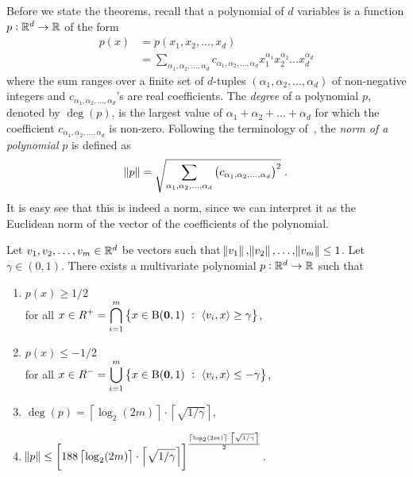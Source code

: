 Before we state the theorems, recall that a polynomial of $d$ variables is a
function $p:\mathbb{R}^d \to \mathbb{R}$ of the form
\begin{align*}
p(x)
& = p(x_1, x_2, \dots, x_d) \\
& = \sum_{\alpha_1, \alpha_2, \dots, \alpha_d} c_{\alpha_1, \alpha_2, \dots, \alpha_d} x_1^{\alpha_1} x_2^{\alpha_2} \dots x_d^{\alpha_d}
\end{align*}
where the sum ranges over a finite set of $d$-tuples $(\alpha_1, \alpha_2,
\dots, \alpha_d)$ of non-negative integers and $c_{\alpha_1, \alpha_2, \dots,
\alpha_d}$'s are real coefficients. The \emph{degree} of a polynomial $p$,
denoted by $\deg(p)$, is the largest value of $\alpha_1 + \alpha_2 + \dots +
\alpha_d$ for which the coefficient $c_{\alpha_1, \alpha_2, \dots, \alpha_d}$ is
non-zero. Following the terminology of~\citet{Klivans-Servedio-2008}, the
\emph{norm of a polynomial} $p$ is defined as
$$
\norm{p} = \sqrt{\sum_{\alpha_1, \alpha_2, \dots, \alpha_d} \left(c_{\alpha_1, \alpha_2, \dots, \alpha_d} \right)^2 } \; .
$$
It is easy see that this is indeed a norm, since we can interpret it as the
Euclidean norm of the vector of the coefficients of the polynomial.

\begin{theorem}
\label{theorem:polynomial-approximation-1}
Let $v_1, v_2, \dots, v_m \in \mathbb{R}^d$ be vectors such that $\norm{v_1},
\norm{v_2}, \dots, \norm{v_m} \le 1$. Let $\gamma \in (0,1)$. There exists a
multivariate polynomial $p:\mathbb{R}^d \to \mathbb{R}$ such that
\begin{enumerate}
\item $p(x) \ge 1/2$ \\ for all $\displaystyle x \in R^+ = \bigcap_{i=1}^m \left\{ x \in \operatorname{B}(\mathbf{0},1) ~:~  \left\langle v_i, x \right\rangle \ge \gamma \right\}$,
\item $p(x) \le -1/2$ \\ for all $\displaystyle x \in R^- = \bigcup_{i=1}^m \left\{ x \in \operatorname{B}(\mathbf{0},1) ~:~  \left\langle v_i, x \right\rangle \le - \gamma \right\}$,
\item $\displaystyle \deg(p) = \left\lceil \log_2(2m) \right\rceil \cdot \left\lceil \sqrt{{1}/{\gamma}} \right\rceil$,
\item $\displaystyle \norm{p} \le \left[ 188 \left\lceil \log_2(2m) \right\rceil \cdot \left\lceil \sqrt{{1}/{\gamma}} \right\rceil \right]^{
  \frac{
    \left\lceil \log_2(2m) \right\rceil \cdot \left\lceil \sqrt{{1}/{\gamma}} \right\rceil
  }{2}
}$.
\end{enumerate}
\end{theorem}


